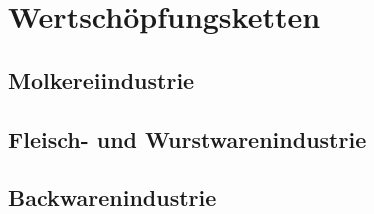 \section{Wertschöpfungsketten}

\subsection{Molkereiindustrie}

\subsection{Fleisch- und Wurstwarenindustrie}

\subsection{Backwarenindustrie}

